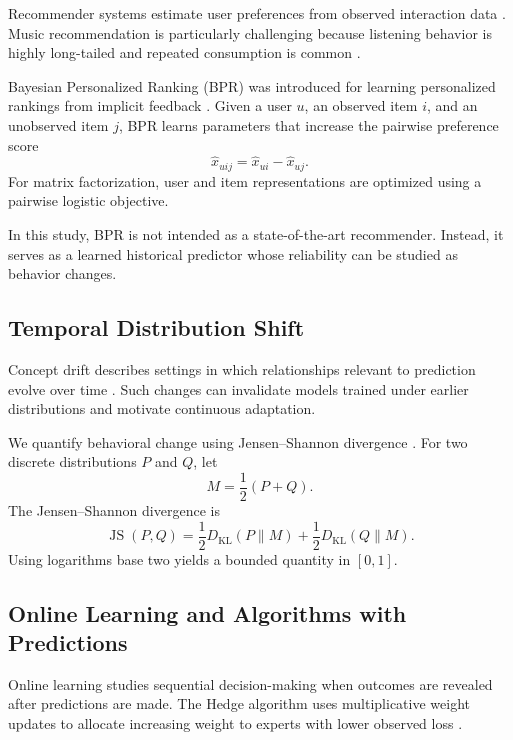 \documentclass[11pt]{article}
\begin{document}
Recommender systems estimate user preferences from observed interaction
data \citep{adomavicius2005toward}. Music recommendation is
particularly challenging because listening behavior is highly
long-tailed and repeated consumption is common
\citep{celma2010music}.

Bayesian Personalized Ranking (BPR) was introduced for learning
personalized rankings from implicit feedback
\citep{rendle2009bpr}. Given a user $u$, an observed item $i$, and an
unobserved item $j$, BPR learns parameters that increase the pairwise
preference score
%
\begin{equation}
    \hat{x}_{uij}
    =
    \hat{x}_{ui}
    -
    \hat{x}_{uj}.
\end{equation}
%
For matrix factorization, user and item representations are optimized
using a pairwise logistic objective.

In this study, BPR is not intended as a state-of-the-art recommender.
Instead, it serves as a learned historical predictor whose reliability
can be studied as behavior changes.

\subsection{Temporal Distribution Shift}

Concept drift describes settings in which relationships relevant to
prediction evolve over time \citep{gama2014survey}. Such changes can
invalidate models trained under earlier distributions and motivate
continuous adaptation.

We quantify behavioral change using Jensen--Shannon divergence
\citep{lin1991divergence}. For two discrete distributions $P$ and $Q$,
let
%
\begin{equation}
    M = \frac{1}{2}(P+Q).
\end{equation}
%
The Jensen--Shannon divergence is
%
\begin{equation}
    \operatorname{JS}(P,Q)
    =
    \frac{1}{2}
    D_{\mathrm{KL}}(P\|M)
    +
    \frac{1}{2}
    D_{\mathrm{KL}}(Q\|M).
\end{equation}
%
Using logarithms base two yields a bounded quantity in $[0,1]$.

\subsection{Online Learning and Algorithms with Predictions}

Online learning studies sequential decision-making when outcomes are
revealed after predictions are made. The Hedge algorithm uses
multiplicative weight updates to allocate increasing weight to experts
with lower observed loss \citep{freund1997decision}.
\end{document}
